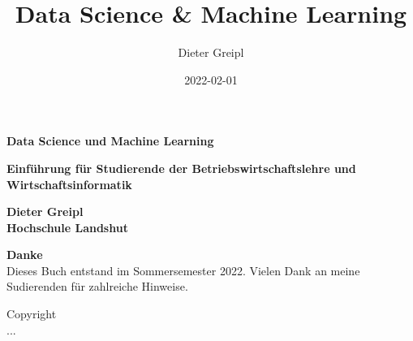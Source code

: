 \documentclass[
  oneside]{book}
\title{Data Science \& Machine Learning}
\author{Dieter Greipl}
\date{2022-02-01}
\begin{document}
\maketitle


\begin{titlepage}

\begin{center}

\Huge \textbf{Data Science und Machine Learning}

\Large \textbf{Einführung für Studierende der Betriebswirtschaftslehre und Wirtschaftsinformatik}


\end{center}

\noindent{}

\vspace{-3cm}
\hfill
\begin{minipage}[b][1cm][t]{10cm}
  \color{white}
  \begin{flushright}
     \Huge\textbf{Dieter Greipl}\\
     \Large\textbf{Hochschule Landshut}\\
  \end{flushright}
\end{minipage}

\end{titlepage}

\begin{titlepage}
\hfill
\begin{minipage}[r][10cm][t]{10cm}
\large \textbf{Danke}\\
	Dieses Buch entstand im Sommersemester 2022. Vielen Dank an meine Sudierenden für zahlreiche Hinweise.
\end{minipage}

\vfill
\begin{minipage}[b][10cm][b]{10cm}
\large{Copyright}\\
	...
\end{minipage}

\end{titlepage}
\end{document}
